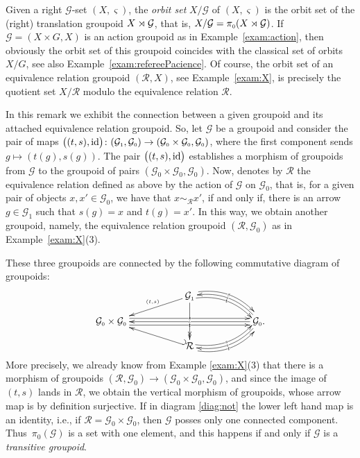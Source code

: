 \documentclass[pdftex]{sigma}
\numberwithin{equation}{section}
\newcommand{\Go}{\cG_{\Sscript{0}}}
\newcommand{\Ga}{\cG_{\Sscript{1}}}
\newcommand{\cG}{{\mathcal G}}
\newcommand{\cR}{{\mathcal R}}
\newcommand{\Sscript}[1]{\scriptscriptstyle{#1}}
\begin{document}
Given a right $\cG$-set $(X,\varsigma)$, the \emph{orbit set} $X/\cG$ of $(X,\varsigma)$ is the orbit set of the (right) translation groupoid $X \rJoin \cG$, that is, $X/\cG=\pi_{\Sscript{0}}(X \rJoin \cG)$. If $\cG=(X\times G, X)$ is an action groupoid as in Example~\ref{exam:action}, then obviously the orbit set of this groupoid coincides with the classical set of orbits $X/G$, see also Example~\ref{exam:refereePacience}. Of course, the orbit set of an equivalence relation groupoid $(\cR, X)$, see Example~\ref{exam:X}, is precisely the quotient set $X/\cR$ modulo the equivalence relation $\cR$.

\begin{Remark}\label{rem:R} In this remark we exhibit the connection between a given groupoid and its attached equivalence relation groupoid. So, let $\cG$ be a groupoid and consider the pair of maps $\big( (t, s), {\rm id}\big)\colon (\Ga, \Go) \to (\Go \times \Go, \Go)$, where the first component sends $g \mapsto (t(g), s(g))$. The pair $\big( (t, s), {\rm id}\big)$ establishes a morphism of groupoids from $\cG$ to the groupoid of pairs $(\Go \times \Go, \Go)$. Now, denotes by $\cR$ the equivalence relation defined as above by the action of $\cG$ on $\Go$, that is, for a given pair of objects $ x, x' \in \Go$, we have that $x\sim_{\Sscript{\cR}} x'$, if and only if, there is an arrow $g \in \Ga$ such that $s(g)=x$ and $t(g)=x'$. In this way, we obtain another groupoid, namely, the equivalence relation groupoid $(\cR, \Go)$ as in Example~\ref{exam:X}(3).

These three groupoids are connected by the following commutative diagram of groupoids:
\begin{gather}\label{diag:not}
\begin{gathered}
\xymatrix@R=12pt{ & & \Ga \ar@{->}_-{\Sscript{(t,s)}}[lld] \ar@{->>}^{}[dd] |!{[dll];[drr]} \hole
\ar@/^1pc/@<0.80ex>@{->}|-{\scriptscriptstyle{{s}}}[rrd]
\ar@/^1pc/@<-0.80ex>@{->}|-{\scriptscriptstyle{{t}}}[rrd] & & \\
\Go \times \Go \ar@<0.80ex>@{->}|-{\scriptscriptstyle{{s}}}[rrrr]
\ar@<-0.80ex>@{->}|-{\scriptscriptstyle{{t}}}[rrrr] & & & &
\ar@{->}|-{\scriptscriptstyle{{\iota}}}[llll] \Go.
\ar@/^1pc/@{->}|-{\scriptscriptstyle{{\iota}}}[dll]
\ar@/_1pc/@{->}|-{\scriptscriptstyle{{\iota}}}[ull] \\ & & \cR
\ar@/_1pc/@<0.80ex>@{->}|-{\scriptscriptstyle{{s}}}[rru]
\ar@/_1pc/@<-0.80ex>@{->}|-{\scriptscriptstyle{{t}}}[rru]
\ar@{_{(}->}[llu] & & }
\end{gathered}
\end{gather}
More precisely, we already know from Example \ref{exam:X}(3) that there is a morphism of groupoids $(\cR, \Go) \to (\Go \times \Go, \Go)$, and since the image of $(t,s)$ lands in $\cR$, we obtain the vertical morphism of groupoids, whose arrow map is by definition surjective. If in diagram \eqref{diag:not} the lower left hand map is an identity, i.e., if $\cR=\Go \times \Go$, then $\cG$ posses only one connected component. Thus~$\pi_{\Sscript{0}}(\cG)$ is a set with one element, and this happens if and only if $\cG$ is a \emph{transitive groupoid}.


\end{Remark}
\end{document}
